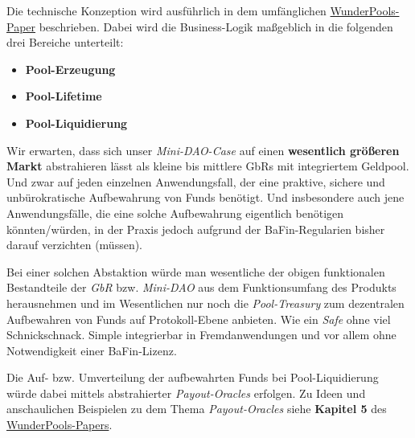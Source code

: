 \vspace{0.3cm}



\begin{Solution}

Die technische Konzeption wird ausführlich in dem umfänglichen \href{https://github.com/WunderPass/White-Paper/blob/main/pools.pdf}{WunderPools-Paper} beschrieben. Dabei wird die Business-Logik maßgeblich in die folgenden drei Bereiche unterteilt:

\begin{itemize}
  \item \textbf{Pool-Erzeugung}
  \item \textbf{Pool-Lifetime}
  \item \textbf{Pool-Liquidierung}
\end{itemize}

\end{Solution}

\vspace{0.3cm}


\begin{Hypothese}

Wir erwarten, dass sich unser \textit{Mini-DAO-Case} auf einen \textbf{wesentlich größeren Markt} abstrahieren lässt als kleine bis mittlere GbRs mit integriertem Geldpool. Und zwar auf jeden einzelnen Anwendungsfall, der eine praktive, sichere und unbüro\-kratische Aufbewahrung von Funds benötigt. Und insbesondere auch jene Anwendungsfälle, die eine solche Aufbewahrung eigentlich benötigen könnten/würden, in der Praxis jedoch aufgrund der BaFin-Regularien bisher darauf verzichten (müssen).

\vspace{0.3cm}

Bei einer solchen Abstaktion würde man wesentliche der obigen funktionalen Bestandteile der \textit{GbR} bzw. \textit{Mini-DAO} aus dem Funktionsumfang des Produkts herausnehmen und im Wesentlichen nur noch die \textit{Pool-Treasury} zum dezentralen Aufbewahren von Funds auf Protokoll-Ebene anbieten. Wie ein \textit{Safe} ohne viel Schnickschnack. Simple integrierbar in Fremdanwendungen und vor allem ohne Notwendigkeit einer BaFin-Lizenz. 

\vspace{0.3cm}

Die Auf- bzw. Umverteilung der aufbewahrten Funds bei Pool-Liquidierung würde dabei mittels abstrahierter \textit{Payout-Oracles} erfolgen. Zu Ideen und anschaulichen Beispielen zu dem Thema \textit{Payout-Oracles} siehe \textbf{Kapitel 5} des \href{https://github.com/WunderPass/White-Paper/blob/main/pools.pdf}{WunderPools-Papers}.

\end{Hypothese}

\vspace{0.3cm}





\vspace{0.5cm}